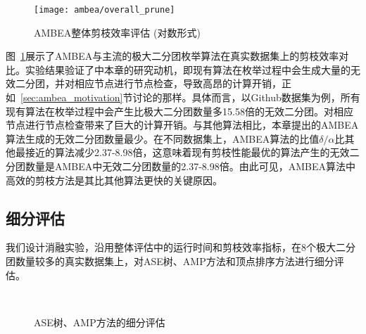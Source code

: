 \begin{figure} [H]
  \centering
  \texttt{[image: ambea/overall\_prune]}
  \caption{AMBEA整体剪枝效率评估 (对数形式)}
  \label{fig:ambea_overall_prune}
\end{figure}

图~\ref{fig:ambea_overall_prune}展示了AMBEA与主流的极大二分团枚举算法在真实数据集上的剪枝效率对比。实验结果验证了中本章的研究动机，即现有算法在枚举过程中会生成大量的无效二分团，并对相应节点进行节点检查，导致高昂的计算开销，正如~\ref{sec:ambea_motivation}节讨论的那样。具体而言，以Github数据集为例，所有现有算法在枚举过程中会产生比极大二分团数量多15.58倍的无效二分团。对相应节点进行节点检查带来了巨大的计算开销。与其他算法相比，本章提出的AMBEA算法生成的无效二分团数量最少。在不同数据集上，AMBEA算法的比值$\delta/\alpha$比其他最接近的算法减少2.37-8.98倍，这意味着现有剪枝性能最优的算法产生的无效二分团数量是AMBEA中无效二分团数量的2.37-8.98倍。由此可见，AMBEA算法中高效的剪枝方法是其比其他算法更快的关键原因。

\subsection{细分评估}

我们设计消融实验，沿用整体评估中的运行时间和剪枝效率指标，在8个极大二分团数量较多的真实数据集上，对ASE树、AMP方法和顶点排序方法进行细分评估。


\begin{figure} [H]
	\centering

  \\

	\caption{ASE树、AMP方法的细分评估}
	\label{fig:ambea_opt}
\end{figure}




